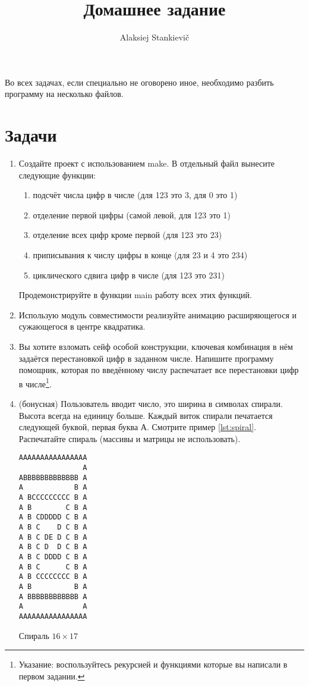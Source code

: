 \documentclass[12pt]{article}
\author{Alaksiej Stankievič}
\title{Домашнее задание}
\begin{document}

Во всех задачах, если специально не оговорено иное, необходимо разбить программу на несколько файлов.

\section{Задачи}

\begin{enumerate}
 \item Создайте проект с использованием make. В отдельный файл вынесите следующие функции:
 \begin{enumerate}
  \item подсчёт числа цифр в числе (для 123 это 3, для 0 это 1)
  \item отделение первой цифры (самой левой, для 123 это 1)
  \item отделение всех цифр кроме первой (для 123 это 23)
  \item приписывания к числу цифры в конце (для 23 и 4 это 234)
  \item циклического сдвига цифр в числе (для 123 это 231)
 \end{enumerate}
  Продемонстрируйте в функции main работу всех этих функций.
 \item Использую модуль совместимости реализуйте анимацию расширяющегося и сужающегося в центре квадратика.
 \item Вы хотите взломать сейф особой конструкции, ключевая комбинация в нём задаётся перестановкой цифр в заданном 
числе. Напишите программу помощник, которая по введённому числу распечатает все перестановки цифр в 
числе\footnote{Указание: воспользуйтесь рекурсией и функциями которые вы написали в первом задании.}.
 \item(бонусная) Пользователь вводит число, это ширина в символах спирали. Высота всегда на единицу больше. Каждый 
виток спирали печатается следующей буквой, первая буква А. Смотрите пример \ref{lst:spiral}. Распечатайте спираль 
(массивы и матрицы не использовать).
\begin{listing}[H]
\begin{center}
\begin{verbatim}
AAAAAAAAAAAAAAAA
               A
ABBBBBBBBBBBBB A
A            B A
A BCCCCCCCCC B A
A B        C B A
A B CDDDDD C B A
A B C    D C B A
A B C DE D C B A
A B C D  D C B A
A B C DDDD C B A
A B C      C B A
A B CCCCCCCC B A
A B          B A
A BBBBBBBBBBBB A
A              A
AAAAAAAAAAAAAAAA
\end{verbatim}
\end{center}
\caption{Спираль $16\times{}17$}
\label{lst:spiral}
\end{listing}
\end{enumerate}
\end{document}

